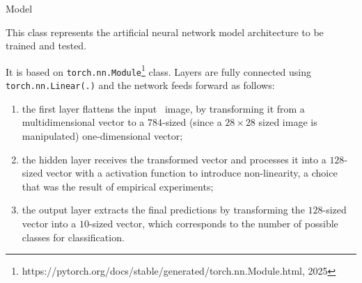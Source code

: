 \begin{subsection}{Model}
    \par This class represents the artificial neural network model architecture to be trained and tested.
    \par It is based on \texttt{torch.nn.Module}\footnote{https://pytorch.org/docs/stable/generated/torch.nn.Module.html, 2025} class. Layers are fully connected using \texttt{torch.nn.Linear(.)} and the network feeds forward as follows:
    \begin{enumerate}
        \item the first layer flattens the input~ image, by transforming it from a multidimensional vector to a $784$-sized (since a $28 \times 28$ sized image is manipulated) one-dimensional vector;
        \item the hidden layer receives the transformed vector and processes it into a $128$-sized vector with a  activation function to introduce non-linearity, a choice that was the result of empirical experiments;
        \item the output layer extracts the final predictions by transforming the $128$-sized vector into a $10$-sized vector, which corresponds to the number of possible classes for classification.
    \end{enumerate}
\end{subsection}